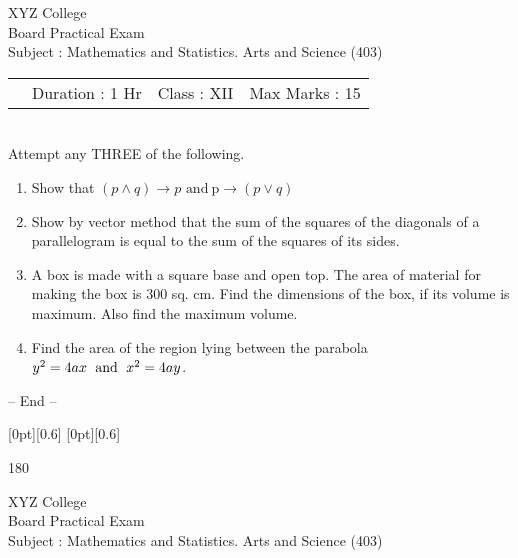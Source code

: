\documentclass[14pt,a4paper]{extarticle}
\begin{document}
\begin{center}
XYZ College\\
Board Practical Exam\doublespacing \\
Subject : Mathematics and Statistics. Arts and Science (403)\\
\end{center}

\hspace{-0.5cm} 
\begin{tabu} to \textwidth { X[l] X[c] X[r]}
\ \  Duration : 1 Hr & Class : XII  & Max Marks : 15\\
\end{tabu} \\

  
 Attempt any THREE of the following.  
\begin{enumerate}
\item Show that 
$(p \wedge q)\to p$ $ \text{and} \ $p$ \to(p \vee q)$  
\item Show by vector method that the sum of the squares of the diagonals of a parallelogram is equal to the sum of the squares of its sides.
\item A box is made with a square base and open top. The area of material for making the box is 300 sq. cm. Find the dimensions of the box, if its volume is maximum. Also find the maximum volume.
\item Find the area of the region lying between the parabola\quad$y^2 = 4ax \text{\; and \;} x^2=4ay$\;.
\end{enumerate}
\begin{center} -- End --   \end{center}


\vspace{1.68em}
\raisebox{-0.5ex}[0pt][0.6\baselineskip]{}
\dotfill 
\raisebox {0.9ex}[0pt][0.6\baselineskip]{\begin{turn}{180} \end{turn}}


\begin{center}
XYZ College\\
Board Practical Exam\doublespacing \\
Subject : Mathematics and Statistics. Arts and Science (403)\\
\end{center}
\end{document}
